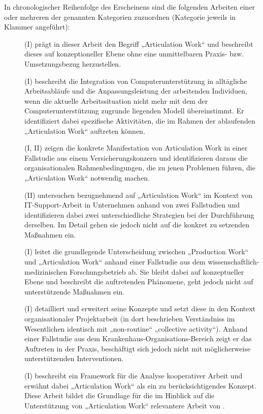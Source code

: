 In chronologischer Reihenfolge des Erscheinens sind die folgenden Arbeiten einer oder mehreren der genannten Kategorien zuzuordnen (Kategorie jeweils in Klammer angeführt):

\begin{description}
	\item[\citet{Strauss85}] (I) prägt in dieser Arbeit den Begriff „Articulation Work“ und beschreibt dieses auf konzeptioneller Ebene ohne eine unmittelbaren Praxis- bzw. Umsetzungsbezug herzustellen.
	\item[\citet{Gasser86}] (I) beschreibt die Integration von Computerunterstützung in alltägliche Arbeitsabläufe und die Anpassungsleistung der arbeitenden Individuen, wenn die aktuelle Arbeitssituation nicht mehr mit dem der Computerunterstützung zugrunde liegenden Modell übereinstimmt. Er identifiziert dabei spezifische Aktivitäten, die im Rahmen der ablaufenden „Articulation Work“ auftreten können.
	\item[\citet{Gerson86}] (I, II) zeigen die konkrete Manifestation von Articulation Work in einer Fallstudie aus einem Versicherungskonzern und identifizieren daraus die organisationalen Rahmenbedingungen, die zu jenen Problemen führen, die „Articulation Work“ notwendig machen.
	\item[\citet{Bendifallah87}] (II) untersuchen bezugnehmend auf \citet{Gasser86} „Articulation Work“ im Kontext von IT-Support-Arbeit in Unternehmen anhand von zwei Fallstudien und identifizieren dabei zwei unterschiedliche Strategien bei der Durchführung derselben. Im Detail gehen sie jedoch nicht auf die konkret zu setzenden Maßnahmen ein.
	\item[\citet{Fujimura87}] (I) leitet die grundlegende Unterscheidung zwischen „Production Work“ und „Articulation Work“ anhand einer Fallstudie aus dem wissenschaftlich-medizinischen Forschungsbetrieb ab. Sie bleibt dabei auf konzeptueller Ebene und beschreibt die auftretenden Phänomene, geht jedoch nicht auf unterstützende Maßnahmen ein.
	\item[\citet{Strauss88}] (I) detailliert und erweitert seine Konzepte und setzt diese in den Kontext organisationaler Projektarbeit (in dort beschrieben Verständniss im Wesentlichen identisch mit „non-routine“ „collective activity“). Anhand einer Fallstudie aus dem Krankenhaus-Organisations-Bereich zeigt er das Auftreten in der Praxis, beschäftigt sich jedoch nicht mit möglicherweise unterstützenden Interventionen.
	\item[\citet{Schmidt90}] (I) beschreibt ein Framework für die Analyse kooperativer Arbeit und erwähnt dabei „Articulation Work“ als ein zu berücksichtigendes Konzept. Diese Arbeit bildet die Grundlage für die im Hinblick auf die Unterstützung von „Articulation Work“ relevantere Arbeit von \citet{Schmidt92}.

\end{description}
